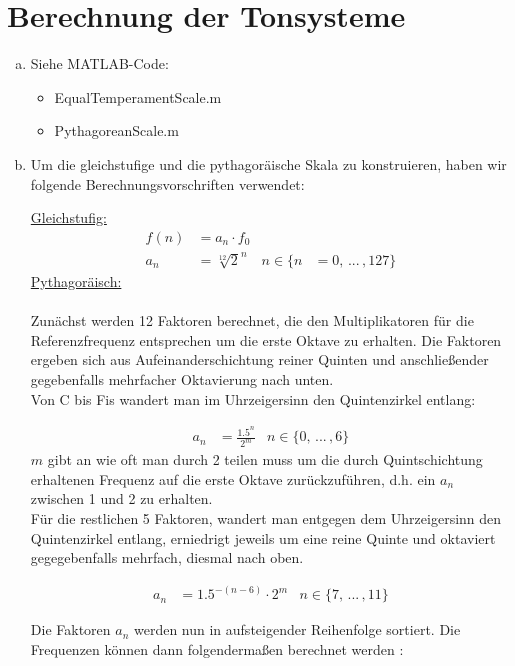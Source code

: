 \chapter{Berechnung der Tonsysteme}

\begin{enumerate}[a)]
\item
Siehe MATLAB-Code:
\begin{itemize}
\item
EqualTemperamentScale.m 
\item
PythagoreanScale.m
\end{itemize}
\item
Um die gleichstufige und die pythagoräische Skala zu konstruieren, haben wir folgende Berechnungsvorschriften verwendet:

\underline{Gleichstufig:}
\\
\begin{align*}
    f(n) &= a_n \cdot f_0 \\ 
    a_n &= \sqrt[12]{2}^n & n \in \{n &= 0, \,... \, ,127\}
\end{align*} 
\underline{Pythagoräisch:}
\\
\\
Zunächst werden 12 Faktoren berechnet, die den Multiplikatoren für die Referenzfrequenz entsprechen um die erste Oktave zu erhalten.
Die Faktoren ergeben sich aus Aufeinanderschichtung reiner Quinten und anschließender gegebenfalls mehrfacher Oktavierung nach unten.
\\
Von C bis Fis wandert man im Uhrzeigersinn den Quintenzirkel entlang:

\begin{align*}
    a_n &= \frac{1.5^n}{2^m} & n \in \{0,  \,... \, ,6\}
\end{align*} 
$m$ gibt an wie oft man durch 2 teilen muss um die durch Quintschichtung erhaltenen Frequenz auf die erste Oktave zurückzuführen, d.h. ein $a_n$ zwischen 1 und 2 zu erhalten.
\\

Für die restlichen 5 Faktoren, wandert man entgegen dem Uhrzeigersinn den Quintenzirkel entlang, erniedrigt jeweils um eine reine Quinte und oktaviert gegegebenfalls mehrfach, diesmal nach oben.

\begin{align*}
    a_n &= 1.5^{-(n-6)} \cdot 2^m & n \in \{ 7, \, ... \, ,11 \}
\end{align*}

Die Faktoren $a_n$ werden nun in aufsteigender Reihenfolge sortiert. Die Frequenzen können dann folgendermaßen berechnet werden :


\end{enumerate}
